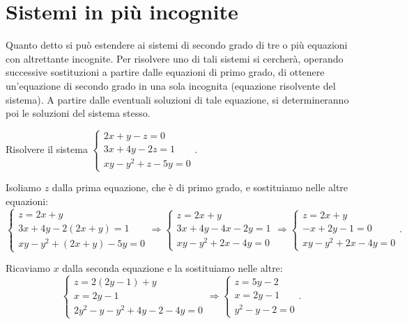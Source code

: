 
\section{Sistemi in più incognite}

Quanto detto si può estendere ai sistemi di secondo grado di tre o più equazioni con altrettante incognite. Per risolvere uno di tali sistemi si cercherà, operando successive sostituzioni a partire dalle equazioni di primo grado, di ottenere un'equazione di secondo grado in una sola incognita (equazione risolvente del sistema).
A partire dalle eventuali soluzioni di tale equazione, si determineranno poi le soluzioni del sistema stesso.
\begin{exrig}
\begin{esempio}
Risolvere il sistema $\left\{\begin{array}{l}2x+y-z=0\\3x+4y-2z=1\\xy-y^2+z-5y=0\end{array}\right.$.

Isoliamo $z$ dalla prima equazione, che è di primo grado, e sostituiamo nelle altre equazioni:
\[ \left\{\begin{array}{l}z=2x+y\\
3x+4y-2(2x+y)=1\\
{xy}-y^2+(2x+y)-5y=0\end{array}\right. \Rightarrow\left\{\begin{array}{l}z=2x+y\\
3x+4y-4x-2y=1\\
xy-y^2+2x-4y=0\end{array}\right. \Rightarrow\left\{\begin{array}{l}z=2x+y\\
-x+2y-1=0\\
xy-y^2+2x-4y=0\end{array}\right..\]

Ricaviamo $x$ dalla seconda equazione e la sostituiamo nelle altre:
\[ \left\{\begin{array}{l}z=2(2y-1)+y\\
x=2y-1\\
2y^2-y-y^2+4y-2-4y=0\end{array}\right. \Rightarrow\left\{\begin{array}{l}z=5y-2\\
x=2y-1\\
y^2-y-2=0\end{array}\right..\]


\end{esempio}
\end{exrig}
